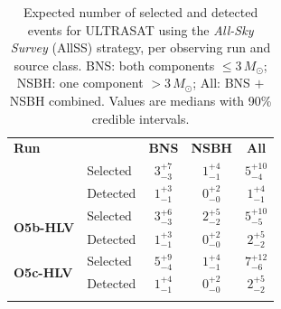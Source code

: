 \begin{table}
\renewcommand\arraystretch{1.3}
\setlength{\tabcolsep}{0.3cm}
\centering
\caption{Expected number of selected and detected events for ULTRASAT using the \emph{All-Sky Survey} (AllSS) strategy, per observing run and source class. BNS: both components $\leq 3\,M_\odot$; NSBH: one component $> 3\,M_\odot$; All: BNS $+$ NSBH combined. Values are medians with 90\% credible intervals.}
\label{tab:ultrasat-allsky-selected-detected-1yr}
\begin{tabular}{llccc}
\Xhline{3\arrayrulewidth}
\textbf{Run} & & \textbf{BNS} & \textbf{NSBH} & \textbf{All} \\
\Xhline{3\arrayrulewidth}
\multirow{2}{*}{\textbf{O5a-HLV}} & Selected & $3_{-3}^{+7}$ & $1_{-1}^{+4}$ & $5_{-4}^{+10}$ \\
 & Detected & $1_{-1}^{+3}$ & $0_{-0}^{+2}$ & $1_{-1}^{+4}$ \\
\hline
\multirow{2}{*}{\textbf{O5b-HLV}} & Selected & $3_{-3}^{+6}$ & $2_{-2}^{+5}$ & $5_{-5}^{+10}$ \\
 & Detected & $1_{-1}^{+3}$ & $0_{-0}^{+2}$ & $2_{-2}^{+5}$ \\
\hline
\multirow{2}{*}{\textbf{O5c-HLV}} & Selected & $5_{-4}^{+9}$ & $1_{-1}^{+4}$ & $7_{-6}^{+12}$ \\
 & Detected & $1_{-1}^{+4}$ & $0_{-0}^{+2}$ & $2_{-2}^{+5}$ \\
\Xhline{3\arrayrulewidth}
\end{tabular}
\end{table}
